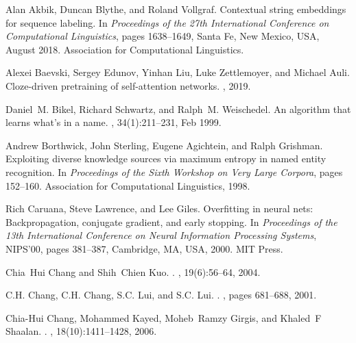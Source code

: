 \documentclass{nle}
\begin{document}
\begin{thebibliography}{}
Alan Akbik, Duncan Blythe, and Roland Vollgraf.
\newblock Contextual string embeddings for sequence labeling.
\newblock In {\em Proceedings of the 27th International Conference on
  Computational Linguistics}, pages 1638--1649, Santa Fe, New Mexico, USA,
  August 2018. Association for Computational Linguistics.

Alexei Baevski, Sergey Edunov, Yinhan Liu, Luke Zettlemoyer, and Michael Auli.
\newblock Cloze-driven pretraining of self-attention networks.
, 2019.

Daniel~M. Bikel, Richard Schwartz, and Ralph~M. Weischedel.
\newblock An algorithm that learns what's in a name.
, 34(1):211--231, Feb 1999.

Andrew Borthwick, John Sterling, Eugene Agichtein, and Ralph Grishman.
\newblock Exploiting diverse knowledge sources via maximum entropy in named
  entity recognition.
\newblock In {\em Proceedings of the Sixth Workshop on Very Large Corpora},
  pages 152--160. Association for Computational Linguistics, 1998.

Rich Caruana, Steve Lawrence, and Lee Giles.
\newblock Overfitting in neural nets: Backpropagation, conjugate gradient, and
  early stopping.
\newblock In {\em Proceedings of the 13th International Conference on Neural
  Information Processing Systems}, NIPS'00, pages 381--387, Cambridge, MA, USA,
  2000. MIT Press.

Chia~Hui Chang and Shih~Chien Kuo.
.
, 19(6):56--64, 2004.

C.H. Chang, C.H. Chang, S.C. Lui, and S.C. Lui.
.
, pages 681--688, 2001.

Chia-Hui Chang, Mohammed Kayed, Moheb~Ramzy Girgis, and Khaled~F Shaalan.
.
,
  18(10):1411--1428, 2006.


\end{thebibliography}
\end{document}
